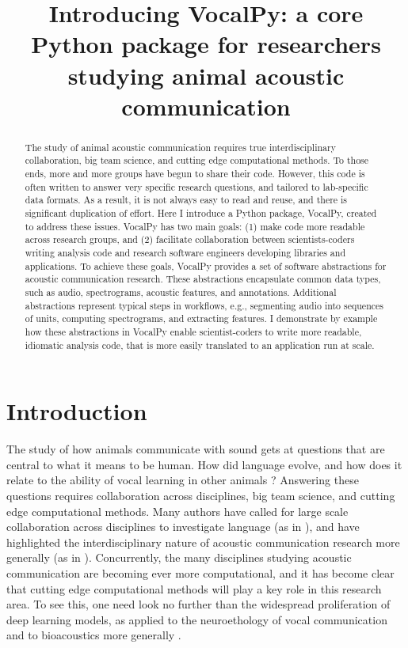 \documentclass[11pt]{article}
\title{Introducing VocalPy: a core Python package for researchers studying animal acoustic communication}
\begin{document}
%
\maketitle
\begin{abstract}
The study of animal acoustic communication requires true interdisciplinary collaboration, big team science, and cutting edge computational methods. To those ends, more and more groups have begun to share their code. However, this code is often written to answer very specific research questions, and tailored to lab-specific data formats. As a result, it is not always easy to read and reuse, and there is significant duplication of effort. Here I introduce a Python package, VocalPy, created to address these issues. VocalPy has two main goals: (1) make code more readable across research groups, and (2) facilitate collaboration between scientists-coders writing analysis code and research software engineers developing libraries and applications. To achieve these goals, VocalPy provides a set of software abstractions for acoustic communication research. These abstractions encapsulate common data types, such as audio, spectrograms, acoustic features, and annotations. Additional abstractions represent typical steps in workflows, e.g., segmenting audio into sequences of units, computing spectrograms, and extracting features. I demonstrate by example how these abstractions in VocalPy enable scientist-coders to write more readable, idiomatic analysis code, that is more easily translated to an application run at scale.
\end{abstract}

\section{Introduction}
\label{sec:introduction}

The study of how animals communicate with sound gets at questions that are central to what it means to be human. How did language evolve, and how does it relate to the ability of vocal learning in other animals  \cite{hauserFacultyLanguageWhat2002, wirthlinModularApproachVocal2019}?
Answering these questions requires collaboration across disciplines, big team science, and cutting edge computational methods.
Many authors have called for large scale collaboration across disciplines to investigate language (as in \cite{hauserFacultyLanguageWhat2002}), and have highlighted the interdisciplinary nature of acoustic communication research more generally (as in \cite{wirthlinModularApproachVocal2019}).
Concurrently, the many disciplines 
studying acoustic communication are becoming ever more computational,
and it has become clear that cutting edge computational methods will play a key role in this research area.
To see this, one need look no further than the widespread proliferation of deep learning models, as applied to the neuroethology of vocal communication \cite{sainburgComputationalNeuroethologyVocal2021} and to bioacoustics more generally \cite{stowellComputationalBioacousticsDeep2022}.
\end{document}
